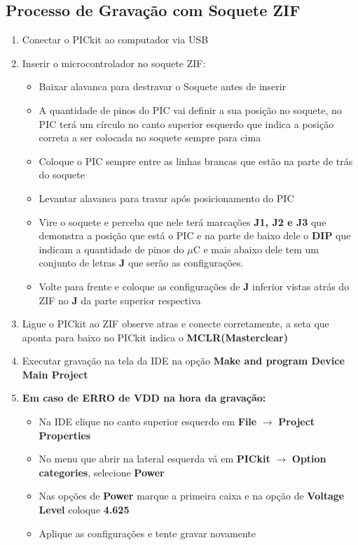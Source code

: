 \documentclass[12pt,a4paper]{book}
\begin{document}
\subsection{Processo de Gravação com Soquete ZIF}
\begin{enumerate}
    \item Conectar o PICkit ao computador via USB
    \item Inserir o microcontrolador no soquete ZIF:
    \begin{itemize}
        \item Baixar alavanca para destravar o Soquete antes de inserir
        \item A quantidade de pinos do PIC vai definir a sua posição no soquete, no PIC terá um círculo no canto superior esquerdo que indica a posição correta a ser colocada no soquete sempre para cima
        \item Coloque o PIC sempre entre as linhas brancas que estão na parte de trás do soquete
        \item Levantar alavanca para travar após posicionamento do PIC
        \item Vire o soquete e perceba que nele terá marcações \textbf{J1, J2 e J3} que demonstra a posição que está o PIC e na parte de baixo dele o \textbf{DIP} que indicam a quantidade de pinos do $\mu$C e mais abaixo dele tem um conjunto de letras \textbf{J} que serão as configurações.
        \item Volte para frente e coloque as configurações de \textbf{J} inferior vistas atrás do ZIF no \textbf{J} da parte superior respectiva
    \end{itemize}
    
    \item Ligue o PICkit ao ZIF observe atras e conecte corretamente, a seta que aponta para baixo no PICkit indica o \textbf{MCLR(Masterclear)}
    \item Executar gravação na tela da IDE na opção \textbf{Make and program Device Main Project}
    \item \textbf{Em caso de ERRO de VDD na hora da gravação:}
    \begin{itemize}
        \item Na IDE clique no canto superior esquerdo em \textbf{File} $\rightarrow$ \textbf{Project Properties}
        \item No menu que abrir na lateral esquerda vá em \textbf{PICkit} $\rightarrow$ \textbf{Option categories}, selecione \textbf{Power}
        \item Nas opções de \textbf{Power} marque a primeira caixa e na opção de \textbf{Voltage Level} coloque \textbf{4.625}
        \item Aplique as configurações e tente gravar novamente
    \end{itemize}
\end{enumerate}
\end{document}
